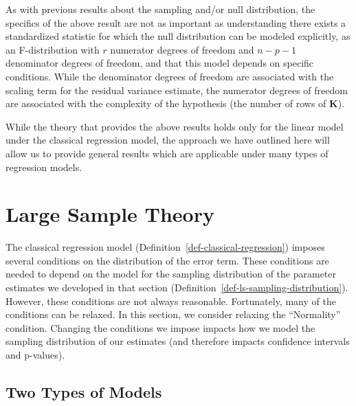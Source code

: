 \documentclass[
  letterpaper,
  DIV=11,
  numbers=noendperiod]{scrreprt}
\theoremstyle{definition}
\theoremstyle{definition}
\theoremstyle{remark}
\begin{document}
As with previous results about the sampling and/or null distribution,
the specifics of the above result are not as important as understanding
there exists a standardized statistic for which the null distribution
can be modeled explicitly, as an F-distribution with \(r\) numerator
degrees of freedom and \(n-p-1\) denominator degrees of freedom, and
that this model depends on specific conditions. While the denominator
degrees of freedom are associated with the scaling term for the residual
variance estimate, the numerator degrees of freedom are associated with
the complexity of the hypothesis (the number of rows of \(\mathbf{K}\)).

While the theory that provides the above results holds only for the
linear model under the classical regression model, the approach we have
outlined here will allow us to provide general results which are
applicable under many types of regression models.

\hypertarget{sec-modeling-large-sample-theory}{%
\chapter{Large Sample Theory}\label{sec-modeling-large-sample-theory}}

\providecommand{\norm}[1]{\lVert#1\rVert}
\providecommand{\abs}[1]{\lvert#1\rvert}
\providecommand{\dist}[1]{\stackrel{\text{#1}}{\sim}}
\providecommand{\ind}[1]{\mathbb{I}\left(#1\right)}
\providecommand{\bm}[1]{\mathbf{#1}}
\providecommand{\bs}[1]{\boldsymbol{#1}}
\providecommand{\Ell}{\mathcal{L}}
\providecommand{\indep}{\perp\negthickspace\negmedspace\perp}

The classical regression model
(Definition~\ref{def-classical-regression}) imposes several conditions
on the distribution of the error term. These conditions are needed to
depend on the model for the sampling distribution of the parameter
estimates we developed in that section
(Definition~\ref{def-ls-sampling-distribution}). However, these
conditions are not always reasonable. Fortunately, many of the
conditions can be relaxed. In this section, we consider relaxing the
``Normality'' condition. Changing the conditions we impose impacts how
we model the sampling distribution of our estimates (and therefore
impacts confidence intervals and p-values).

\hypertarget{two-types-of-models}{%
\section{Two Types of Models}\label{two-types-of-models}}
\end{document}
